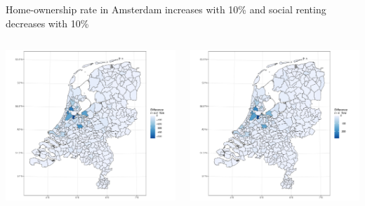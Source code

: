 \documentclass{beamer}
\begin{document}
\begin{frame}{Home-ownership rate in Amsterdam increases with 10\% and social renting decreases with 10\%}
	\begin{columns}
		\begin{column}{0.5\textwidth}
			\begin{center}
				\includegraphics[width=1.1\textwidth]{../fig/p_diff_out}      
			\end{center}
		\end{column}
		\begin{column}{0.5\textwidth} 	
			\begin{center}
				\includegraphics[width=1.1\textwidth]{../fig/p_diff_in}      
			\end{center}
		\end{column}
	\end{columns}
\end{frame}
\end{document}
